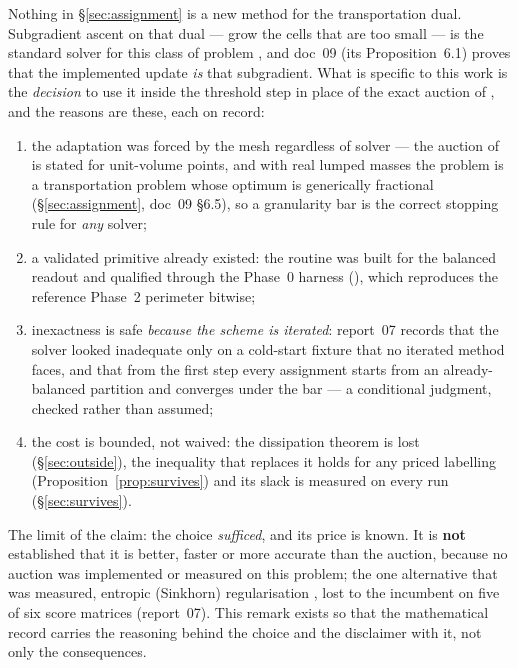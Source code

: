 \documentclass[11pt,a4paper]{article}
\begin{document}
\begin{remark}
\label{rem:solver-choice}
Nothing in \S\ref{sec:assignment} is a new method for the transportation dual.
Subgradient ascent on that dual --- grow the cells that are too small --- is
the standard solver for this class of problem
\cite{aurenhammer1998minkowski, merigot2011multiscale, peyre2019computational},
and doc~09 (its Proposition~6.1) proves that the implemented update \emph{is}
that subgradient. What is specific to this work is the \emph{decision} to use it
inside the threshold step in place of the exact auction of
\cite{jacobs2018auction}, and the reasons are these, each on record:
\begin{enumerate}[itemsep=1pt]
  \item the adaptation was forced by the mesh regardless of solver --- the
    auction of \cite{jacobs2018auction} is stated for unit-volume points, and
    with real lumped masses the problem is a transportation problem whose
    optimum is generically fractional (\S\ref{sec:assignment}, doc~09 \S6.5), so
    a granularity bar is the correct stopping rule for \emph{any} solver;
  \item a validated primitive already existed: the routine was built for the
    balanced readout and qualified through the Phase~0 harness
    (), which reproduces the
    reference Phase~2 perimeter bitwise;
  \item inexactness is safe \emph{because the scheme is iterated}: report~07
    records that the solver looked inadequate only on a cold-start fixture that
    no iterated method faces, and that from the first step every assignment
    starts from an already-balanced partition and converges under the bar ---
    a conditional judgment, checked rather than assumed;
  \item the cost is bounded, not waived: the dissipation theorem is lost
    (\S\ref{sec:outside}), the inequality that replaces it holds for any priced
    labelling (Proposition~\ref{prop:survives}) and its slack is measured on
    every run (\S\ref{sec:survives}).
\end{enumerate}
The limit of the claim: the choice \emph{sufficed}, and its price is known. It
is \textbf{not} established that it is better, faster or more accurate than the
auction, because no auction was implemented or measured on this problem; the
one alternative that was measured, entropic (Sinkhorn) regularisation
\cite{cuturi2013sinkhorn}, lost to the incumbent on five of six score matrices
(report~07). This remark exists so that the mathematical record carries the
reasoning behind the choice and the disclaimer with it, not only the
consequences.
\end{remark}
\end{document}
